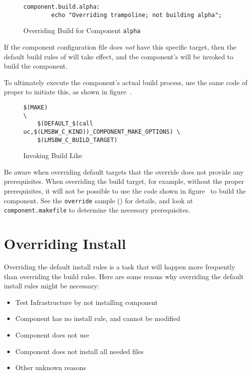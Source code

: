 \begin{figure}[ht]
  \hrulefill
\begin{verbatim}
component.build.alpha:
        echo "Overriding trampoline; not building alpha";
\end{verbatim}
  \caption{Overriding Build for Component \texttt{alpha}}\label{overriding:override-build-alpha}
  \hrulefill
\end{figure}


If the component configuration file does \emph{not} have this specific
target, then the default build rules of \lmsbw will take effect, and
tbe component's \makefile will be invoked to build the component.

To ultimately execute the component's actual build process, use the
same code of \lmsbw proper to initiate this, as shown in
figure~.

\begin{figure}[ht]
  \hrulefill
\begin{footnotesize}
\begin{verbatim}
$(MAKE)                                                          \
    $(DEFAULT_$(call uc,$(LMSBW_C_KIND))_COMPONENT_MAKE_OPTIONS) \
    $(LMSBW_C_BUILD_TARGET)
\end{verbatim}
\end{footnotesize}
  \caption{Invoking Build Like \lmsbw}\label{overriding:invoke-build-like-lmsbw}
  \hrulefill
\end{figure}


Be aware when overriding default targets that the override does not
provide any prerequisites.  When overriding the build target, for
example, without the proper prerequisites, it will not be possible to
use the code shown in
figure~\tabref{overriding:invoke-build-like-lmsbw} to build the
component.  See the \texttt{override} sample ()
for details, and look at \texttt{component.makefile} to determine the
necessary prerequisites.

\section{Overriding Install}\label{overriding:overriding-install}

Overriding the default install rules is a task that will happen more
frequently than overriding the build rules.  Here are some reaons why
overriding the default install rules might be necessary:

\begin{itemize}
\item Test \bni Infrastructure by not installing component
\item Component \makefile has no install rule, and cannot be modified
\item Component \makefile does not use \destdir
\item Component does not install all needed files
\item Other unknown reasons
\end{itemize}

